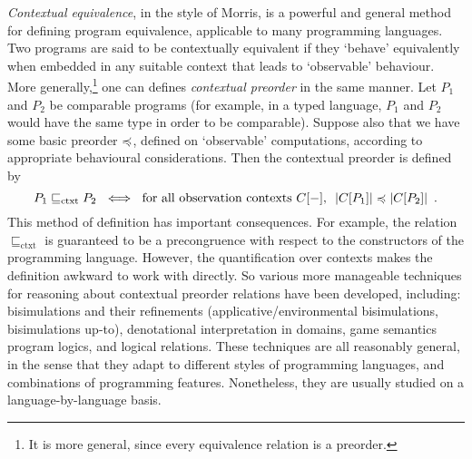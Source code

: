\emph{Contextual equivalence}, in the style of Morris,
is a powerful and general method for defining program equivalence, applicable to many 
programming languages. 
Two programs are said to be contextually equivalent if 
they `behave' equivalently when embedded in any suitable context that leads to `observable' behaviour. 
More generally,\footnote{It is more general, since every equivalence relation is a preorder.} one can defines \emph{contextual preorder} in the same manner. Let $P_1$ and $P_2$ be comparable programs (for example, in a typed language, $P_1$ and $P_2$ would  have the same type in order to be comparable). Suppose also that we have some {basic preorder} $\preccurlyeq$, defined on `observable' computations, according to appropriate behavioural considerations. Then the contextual preorder is defined by
\begin{equation}
\label{equation:contextual-preorder}
P_1 \sqsubseteq_\text{ctxt} P_2 ~ \iff ~
\text{for all observation contexts $C[-]$, $~ |C[P_1]| \preccurlyeq |C[P_2]|$} \enspace . 
\end{equation}
This method of definition has important consequences. For example, the relation
$\sqsubseteq_\text{ctxt}$ is guaranteed to be a precongruence with respect 
to the constructors of the programming language.
However, the quantification over contexts makes the definition awkward to work with directly.
So various more manageable techniques for reasoning about contextual preorder relations have been developed, including:
bisimulations 
and their refinements (applicative/environmental bisimulations, 
bisimulations up-to), %
denotational interpretation in domains, %
game semantics %
program logics,
and logical relations. %
These techniques are all reasonably general, in the sense that they adapt to different styles of programming languages, and combinations of programming features. Nonetheless, they are usually studied on a language-by-language basis.

